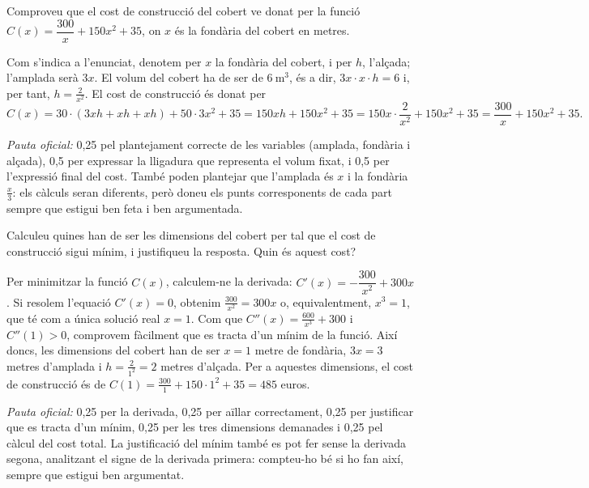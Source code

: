 \begin{apartats}

Comproveu que el cost de construcció del cobert ve donat per la funció $C(x)=\dfrac{300}{x}+150x^2+35$, on $x$ és
la fondària del cobert en metres.

\begin{solucio}
Com s'indica a l'enunciat, denotem per $x$ la fondària del cobert, i per $h$, l'alçada; l'amplada serà $3x$. El
volum del cobert ha de ser de $6\ \text{m}^3$, és a dir, $3x\cdot x\cdot h=6$ i, per tant, $h=\frac{2}{x^2}$. El
cost de construcció és donat per
\[
C(x)=30\cdot(3xh+xh+xh)+50\cdot3x^2+35=150xh+150x^2+35=150x\cdot\frac{2}{x^2}+150x^2+35=\frac{300}{x}+150x^2+35 .
\]

\textit{Pauta oficial:} 0,25 pel plantejament correcte de les variables (amplada, fondària i alçada), 0,5 per
expressar la lligadura que representa el volum fixat, i 0,5 per l'expressió final del cost. També poden plantejar
que l'amplada és $x$ i la fondària $\frac x3$: els càlculs seran diferents, però doneu els punts corresponents de
cada part sempre que estigui ben feta i ben argumentada.
\end{solucio}

Calculeu quines han de ser les dimensions del cobert per tal que el cost de construcció sigui mínim, i
justifiqueu la resposta. Quin és aquest cost?

\begin{solucio}
Per minimitzar la funció $C(x)$, calculem-ne la derivada: $C'(x)=-\dfrac{300}{x^2}+300x$. Si resolem l'equació
$C'(x)=0$, obtenim $\frac{300}{x^2}=300x$ o, equivalentment, $x^3=1$, que té com a única solució real $x=1$.
Com que $C''(x)=\frac{600}{x^3}+300$ i $C''(1)>0$, comprovem fàcilment que es tracta d'un mínim de la funció.
Així doncs, les dimensions del cobert han de ser $x=1$ metre de fondària, $3x=3$ metres d'amplada i
$h=\frac{2}{1^2}=2$ metres d'alçada. Per a aquestes dimensions, el cost de construcció és de
$C(1)=\frac{300}{1}+150\cdot1^2+35=485$ euros.

\textit{Pauta oficial:} 0,25 per la derivada, 0,25 per aïllar correctament, 0,25 per justificar que es tracta
d'un mínim, 0,25 per les tres dimensions demanades i 0,25 pel càlcul del cost total. La justificació del mínim
també es pot fer sense la derivada segona, analitzant el signe de la derivada primera: compteu-ho bé si ho fan
així, sempre que estigui ben argumentat.
\end{solucio}

\end{apartats}
